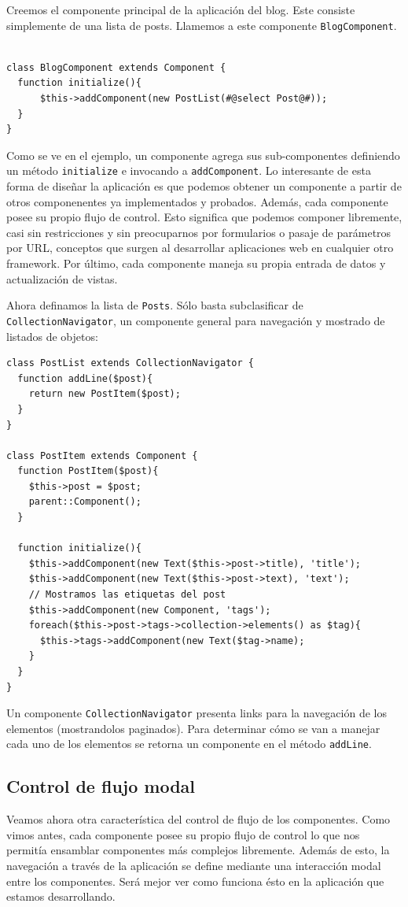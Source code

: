 Creemos el componente principal de la aplicación del blog. Este consiste simplemente de una lista de posts. Llamemos a este componente \verb"BlogComponent".

\begin{verbatim}

class BlogComponent extends Component {
  function initialize(){
      $this->addComponent(new PostList(#@select Post@#));
  }
}
\end{verbatim}

Como se ve en el ejemplo, un componente agrega sus sub-componentes definiendo un método \verb"initialize" e invocando a \verb"addComponent". Lo interesante de esta forma de diseñar la aplicación es que podemos obtener un componente a partir de otros componenentes ya implementados y probados. Además, cada componente posee su propio flujo de control. Esto significa que podemos componer libremente, casi sin restricciones y sin preocuparnos por formularios o pasaje de parámetros por URL, conceptos que surgen al desarrollar aplicaciones web en cualquier otro framework. Por último, cada componente maneja su propia entrada de datos y actualización de vistas.

Ahora definamos la lista de \verb"Posts". Sólo basta subclasificar de \verb"CollectionNavigator", un componente general para navegación y mostrado de listados de objetos:

\begin{verbatim}
class PostList extends CollectionNavigator {
  function addLine($post){
    return new PostItem($post);
  }
}

class PostItem extends Component {
  function PostItem($post){
    $this->post = $post;
    parent::Component();
  }

  function initialize(){
    $this->addComponent(new Text($this->post->title), 'title');
    $this->addComponent(new Text($this->post->text), 'text');
    // Mostramos las etiquetas del post
    $this->addComponent(new Component, 'tags');
    foreach($this->post->tags->collection->elements() as $tag){
      $this->tags->addComponent(new Text($tag->name);
    }
  }
}

\end{verbatim}

Un componente \verb"CollectionNavigator" presenta links para la navegación de los elementos (mostrandolos paginados). Para determinar cómo se van a manejar cada uno de los elementos se retorna un componente en el método \verb"addLine".

\subsection{Control de flujo modal}
\label{sub-modal-flow}
Veamos ahora otra característica del control de flujo de los componentes. Como vimos antes, cada componente posee su propio flujo de control lo que nos permitía ensamblar componentes más complejos libremente. Además de esto, la navegación a través de la aplicación se define mediante una interacción modal entre los componentes. Será mejor ver como funciona ésto en la aplicación que estamos desarrollando.

